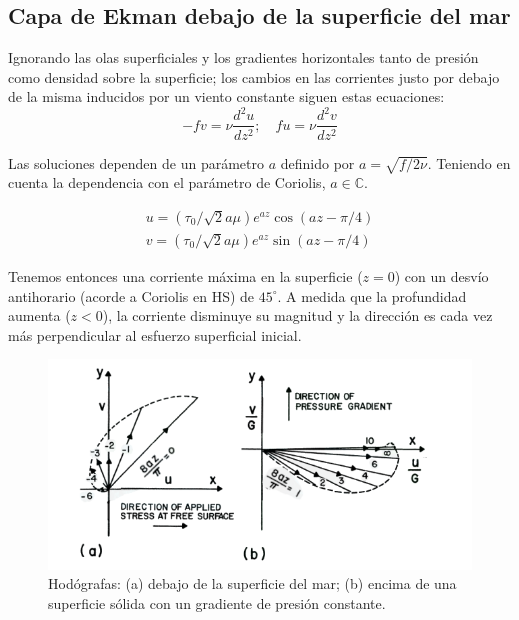 \documentclass[openany,a4]{book}
\begin{document}
\subsection{Capa de Ekman debajo de la superficie del mar}
Ignorando las olas superficiales y los gradientes horizontales tanto
de presión como densidad sobre la superficie; los cambios en las
corrientes justo por debajo de la misma inducidos por un viento
constante siguen estas ecuaciones:
\begin{equation}
    -fv=\nu \frac{d^2u}{dz^2};\quad fu=\nu \frac{d^2v}{dz^2}
\end{equation}

\par Las soluciones dependen de un parámetro $a$ definido por
$a=\sqrt{f/2\nu}$. Teniendo en cuenta la dependencia con el parámetro
de Coriolis, $a\in\mathbb{C}$.

\begin{gather}
    u=(\tau_0/\sqrt{2}a\mu)e^{az}\cos{(az-\pi/4)}\\
    v=(\tau_0/\sqrt{2}a\mu)e^{az}\sin{(az-\pi/4)}
\end{gather}

\par Tenemos entonces una corriente máxima en la superficie ($z=0$)
con un desvío antihorario (acorde a Coriolis en HS) de $45^\circ$. A
medida que la profundidad aumenta ($z<0$), la corriente disminuye su
magnitud y la dirección es cada vez más perpendicular al esfuerzo
superficial inicial.

\begin{figure}[htbp]
    \centering
    \includegraphics[width=\linewidth]{img/ekman-HS.png} 
    \caption{Hodógrafas: (a) debajo de la superficie del mar; (b)
    encima de una superficie sólida con un gradiente de presión
    constante.}
    \label{fig:ekman}
\end{figure}
\end{document}
